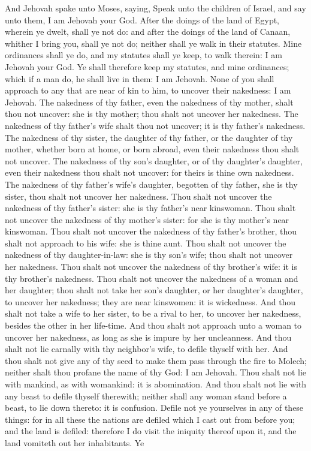 And Jehovah spake unto Moses, saying, Speak unto the children of Israel, and say unto them, I am Jehovah your God. After the doings of the land of Egypt, wherein ye dwelt, shall ye not do: and after the doings of the land of Canaan, whither I bring you, shall ye not do; neither shall ye walk in their statutes. Mine ordinances shall ye do, and my statutes shall ye keep, to walk therein: I am Jehovah your God. Ye shall therefore keep my statutes, and mine ordinances; which if a man do, he shall live in them: I am Jehovah.  None of you shall approach to any that are near of kin to him, to uncover their nakedness: I am Jehovah. The nakedness of thy father, even the nakedness of thy mother, shalt thou not uncover: she is thy mother; thou shalt not uncover her nakedness. The nakedness of thy father’s wife shalt thou not uncover; it is thy father’s nakedness. The nakedness of thy sister, the daughter of thy father, or the daughter of thy mother, whether born at home, or born abroad, even their nakedness thou shalt not uncover. The nakedness of thy son’s daughter, or of thy daughter’s daughter, even their nakedness thou shalt not uncover: for theirs is thine own nakedness. The nakedness of thy father’s wife’s daughter, begotten of thy father, she is thy sister, thou shalt not uncover her nakedness. Thou shalt not uncover the nakedness of thy father’s sister: she is thy father’s near kinswoman. Thou shalt not uncover the nakedness of thy mother’s sister: for she is thy mother’s near kinswoman. Thou shalt not uncover the nakedness of thy father’s brother, thou shalt not approach to his wife: she is thine aunt. Thou shalt not uncover the nakedness of thy daughter-in-law: she is thy son’s wife; thou shalt not uncover her nakedness. Thou shalt not uncover the nakedness of thy brother’s wife: it is thy brother’s nakedness. Thou shalt not uncover the nakedness of a woman and her daughter; thou shalt not take her son’s daughter, or her daughter’s daughter, to uncover her nakedness; they are near kinswomen: it is wickedness. And thou shalt not take a wife to her sister, to be a rival to her, to uncover her nakedness, besides the other in her life-time.  And thou shalt not approach unto a woman to uncover her nakedness, as long as she is impure by her uncleanness. And thou shalt not lie carnally with thy neighbor’s wife, to defile thyself with her. And thou shalt not give any of thy seed to make them pass through the fire to Molech; neither shalt thou profane the name of thy God: I am Jehovah. Thou shalt not lie with mankind, as with womankind: it is abomination. And thou shalt not lie with any beast to defile thyself therewith; neither shall any woman stand before a beast, to lie down thereto: it is confusion.  Defile not ye yourselves in any of these things: for in all these the nations are defiled which I cast out from before you; and the land is defiled: therefore I do visit the iniquity thereof upon it, and the land vomiteth out her inhabitants. Ye 